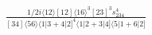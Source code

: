 \documentclass[varwidth, border=5pt]{standalone}
\begin{document}
\begin{my}
$\begin{gathered}
\scriptscriptstyle\frac{1/2i\langle12\rangle[12]\langle16\rangle^3[23]^3s_{234}^4}{[34]\langle56\rangle\langle1|3+4|2]^4\langle1|2+3|4]\langle5|1+6|2]}
\end{gathered}$
\end{my}
\end{document}

